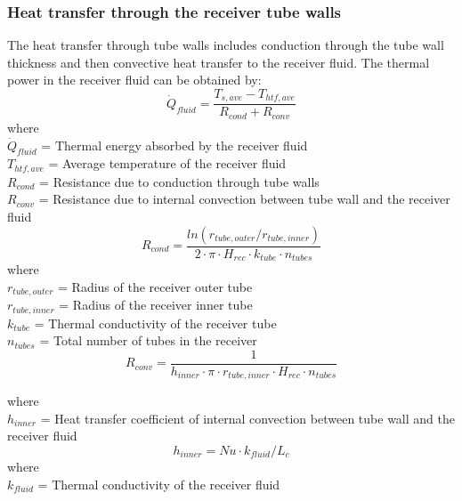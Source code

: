 \subsubsection{Heat transfer through the receiver tube walls}
The heat transfer through tube walls includes conduction through the tube wall thickness and then convective heat transfer to the receiver fluid. The thermal power in the receiver fluid can be obtained by: 
\begin{equation}
\dot Q_{fluid} = \frac {T_{s,ave}-T_{htf,ave}}{R_{cond}+R_{conv}}
\end{equation}
where\\
$ \dot Q_{fluid}$ = Thermal energy absorbed by the receiver fluid\\
$T_{htf,ave}$ = Average temperature of the receiver fluid\\
$R_{cond}$ = Resistance due to conduction through tube walls\\
$R_{conv}$ = Resistance due to internal convection between tube wall and the receiver fluid\\

\begin{equation}
R_{cond} = \frac{ln(r_{tube,outer}/r_{tube,inner})}{2\cdot \pi\cdot H_{rec}\cdot k_{tube}\cdot n_{tubes}}
\end{equation}
where\\
$ r_{tube,outer}$ = Radius of the receiver outer tube\\
$ r_{tube,inner}$ = Radius of the receiver inner tube\\
$ k_{tube}$ = Thermal conductivity of the receiver tube\\
$ n_{tubes}$ = Total number of tubes in the receiver \\

\begin{equation}
R_{conv} = \frac {1}{h_{inner}\cdot \pi\cdot r_{tube,inner}\cdot H_{rec}\cdot n_{tubes}}
\end{equation}

where\\
$ h_{inner} $ = Heat transfer coefficient of internal convection between tube wall and the receiver fluid\\

\begin{equation}
h_{inner}=Nu\cdot k_{fluid}/L_c
\end{equation}
where\\
$ k_{fluid} $ = Thermal conductivity of the receiver fluid\\

